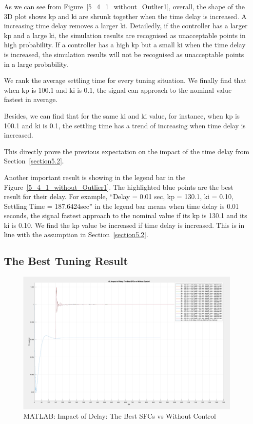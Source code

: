 As we can see from Figure~\ref{5_4_1_without_Outlier1}, overall, the shape of the 3D plot shows kp and ki are shrunk together when the time delay is increased. A increasing time delay removes a larger ki. Detailedly, if the controller has a larger kp and a large ki, the simulation results are recognised as unacceptable points in high probability. If a controller has a high kp but a small ki when the time delay is increased, the simulation results will not be recognised as unacceptable points in a large probability. 

We rank the average settling time for every tuning situation. We finally find that when kp is 100.1 and ki is 0.1, the signal can approach to the nominal value fastest in average. 

Besides, we can find that for the same ki and ki value, for instance, when kp is 100.1 and ki is 0.1, the settling time has a trend of increasing when time delay is increased.  

This directly prove the previous expectation on the impact of the time delay from Section~\ref{section5.2}.  


Another important result is showing in the legend bar in the Figure~\ref{5_4_1_without_Outlier1}. The highlighted blue points are the best result for their delay. For example, “Delay = 0.01 sec, kp = 130.1, ki = 0.10, Settling Time = 187.6424sec” in the legend bar means when time delay is 0.01 seconds, the signal fastest approach to the nominal value if its kp is 130.1 and its ki is 0.10. We find the kp value be increased if time delay is increased. This is in line with the assumption in Section~\ref{section5.2}. 

\subsection{The Best Tuning Result} %
\begin{figure}[htbp]
\centering
\includegraphics[width = .819\textwidth]{figure/5_4_2.png}
\caption{MATLAB: Impact of Delay: The Best SFCs vs Without Control}
\label{5_4_2}
\end{figure}